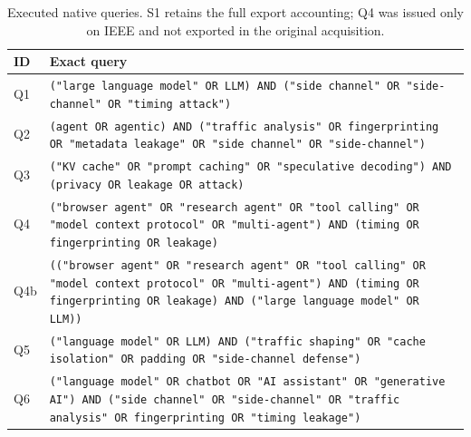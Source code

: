 \begin{table}[!b]\centering\footnotesize
\caption{Executed native queries. S1 retains the full export accounting; Q4 was issued only on IEEE and not exported in the original acquisition.}\label{tab:native-executable-queries}
\begin{tabularx}{\columnwidth}{@{}lY@{}}\toprule
ID & Exact query\\\midrule
Q1 & \texttt{("large language model" OR LLM) AND ("side channel" OR "side-channel" OR "timing attack")}\\
Q2 & \texttt{(agent OR agentic) AND ("traffic analysis" OR fingerprinting OR "metadata leakage" OR "side channel" OR "side-channel")}\\
Q3 & \texttt{("KV cache" OR "prompt caching" OR "speculative decoding") AND (privacy OR leakage OR attack)}\\
Q4 & \texttt{("browser agent" OR "research agent" OR "tool calling" OR "model context protocol" OR "multi-agent") AND (timing OR fingerprinting OR leakage)}\\
Q4b & \texttt{(("browser agent" OR "research agent" OR "tool calling" OR "model context protocol" OR "multi-agent") AND (timing OR fingerprinting OR leakage) AND ("large language model" OR LLM))}\\
Q5 & \texttt{("language model" OR LLM) AND ("traffic shaping" OR "cache isolation" OR padding OR "side-channel defense")}\\
Q6 & \texttt{("language model" OR chatbot OR "AI assistant" OR "generative AI") AND ("side channel" OR "side-channel" OR "traffic analysis" OR fingerprinting OR "timing leakage")}\\\bottomrule
\end{tabularx}\end{table}

